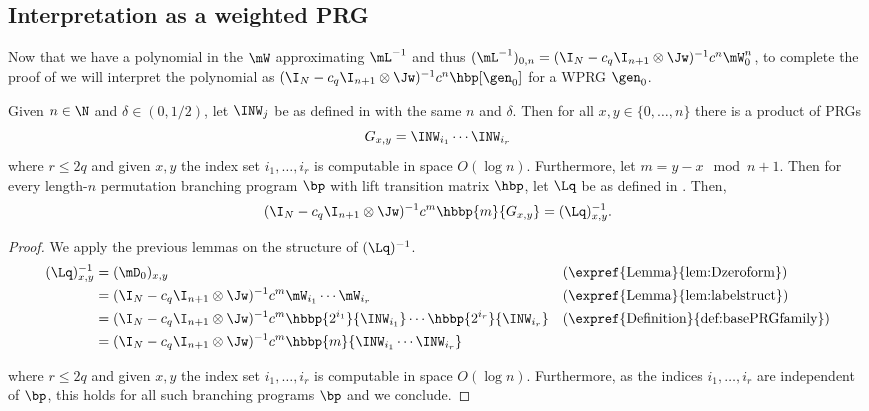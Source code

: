\documentclass{toc}
\begin{document}
\subsection{Interpretation as a weighted PRG}
Now that we have a polynomial in the %
$\mW$  %
approximating $\mL^{-1}$ and thus $(\mL^{-1})_{0,n}=(\I_N-c_q\I_{n+1}\otimes\Jw)^{-1}c^n\mW_0^n$, to complete the proof of  we will interpret the polynomial as $(\I_N-c_q\I_{n+1}\otimes\Jw)^{-1}c^n\hbp[\gen_0]$ for a WPRG $\gen_0$.
\begin{lemma}\label{lem:baseG}
Given $n\in\N$ and $\delta \in (0,1/2)$, let $\INW_{j}$ be as defined in  with the same $n$ and $\delta$. Then for all $x,y \in \{0,\ldots,n\}$ there is a product of PRGs 
$$G_{x,y}=\INW_{i_1}\cdots\INW_{i_r}$$ 
where $r\leq 2q$ and given $x,y$ the index set $i_1,\dots,i_r$ is computable in space $O(\log n)$. Furthermore, let $m=y-x \mod n+1$. Then for every length-$n$ permutation branching program $\bp$ with lift transition matrix $\hbp$, let $\Lq$ be as defined in . Then,
$$ (\I_N-c_q\I_{n+1}\otimes\Jw )^{-1}c^m\hbbp{m}{G_{x,y}}=(\Lq)^{-1}_{x,y}.$$
\end{lemma}
\begin{proof}
We apply the previous lemmas on the structure of $(\Lq)^{-1}$. %
\begin{align*}
(\Lq)^{-1}_{x,y} &= (\mD_0)_{x,y} && \text{(\expref{Lemma}{lem:Dzeroform})}\\
&= (\I_N-c_q\I_{n+1}\otimes\Jw )^{-1}c^m\mW_{i_1}\cdots\mW_{i_r} && \text{(\expref{Lemma}{lem:labelstruct})}\\
&=(\I_N-c_q\I_{n+1}\otimes\Jw )^{-1}c^m \hbbp{2^{i_1}}{\INW_{i_1}}\cdots\hbbp{2^{i_r}}{\INW_{i_r}} && \text{(\expref{Definition}{def:basePRGfamily})}\\
&=(\I_N-c_q\I_{n+1}\otimes\Jw )^{-1}c^m\hbbp{m}{\INW_{i_1}\cdots\INW_{i_r}}
\end{align*}

where $r\leq 2q$ and given $x,y$ the index set $i_1,\dots,i_r$ is computable in space $O(\log n)$. Furthermore, as the indices $i_1,\dots,i_r$ are independent of $\bp$, this holds for all such branching programs $\bp$ and we conclude.
\end{proof}
\end{document}
